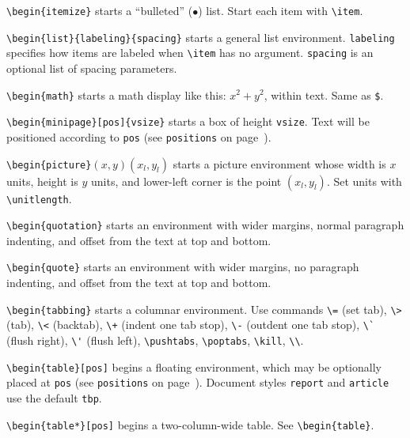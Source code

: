 \verb"\begin{itemize}" starts a ``bulleted'' ($\bullet$) list. 
        Start each item with \verb"\item".

\verb"\begin{list}{labeling}{spacing}" starts a general list environment.
	\verb"labeling" specifies how items are labeled when \verb"\item"
	has no argument.  \verb"spacing" is an optional list of
	spacing parameters.

\verb"\begin{math}" starts a math display like this: $x^2 + y^2$, within text.
	Same as \verb"$".

\verb"\begin{minipage}[pos]{vsize}" starts a box of height \verb"vsize".
	Text will be positioned according to \verb"pos" (see \verb"positions"
	on page~\pageref{pos-ref}).

\verb"\begin{picture}"$(x,y)(x_l,y_l)$ starts a picture environment whose
	width is $x$ units, height is $y$ units, and lower-left corner is
	the point $(x_l,y_l)$.  Set units with \verb"\unitlength".

\verb"\begin{quotation}" starts an environment with wider margins, normal
	paragraph indenting, and offset from the text at top and bottom.

\verb"\begin{quote}" starts an environment with wider margins, no paragraph
	indenting, and offset from the text at top and bottom.

\verb"\begin{tabbing}" starts a columnar environment.  Use commands
	\verb"\=" (set tab), \verb"\>" (tab), \verb"\<" (backtab),
	\verb"\+" (indent one tab stop), \verb"\-" (outdent one tab stop),
	\verb"\`" (flush right), \verb"\'" (flush left), \verb"\pushtabs",
	\verb"\poptabs", \verb"\kill", \verb"\\".

\verb"\begin{table}[pos]" begins a floating environment, which may be
	optionally placed at \verb"pos" (see \verb"positions" on
	page~\pageref{pos-ref}). Document styles \verb"report" and
	\verb"article" use the default \verb"tbp".

\verb"\begin{table*}[pos]" begins a two-column-wide table.
	See \verb"\begin{table}".

